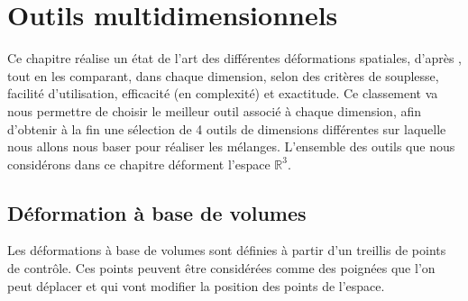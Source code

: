 
\chapter{Outils multidimensionnels}

\graphicspath{{Chapter1/Chapter1Figs/PNG/}{Chapter1/Chapter1Figs/PDF/}{Chapter1/Chapter1Figs/}}

Ce chapitre réalise un état de l'art des différentes déformations
spatiales, d'après \cite{GB08}, tout en les comparant, dans chaque
dimension, selon des critères de souplesse, facilité d'utilisation,
efficacité (en complexité) et exactitude. Ce classement va nous
permettre de choisir le meilleur outil associé à chaque dimension,
afin d'obtenir à la fin une sélection de 4 outils de dimensions
différentes sur laquelle nous allons nous baser pour réaliser les
mélanges. L'ensemble des outils que nous considérons dans ce chapitre
déforment l'espace $\mathbb{R}^3$.

\section{Déformation à base de volumes}
Les déformations à base de volumes sont définies à partir d'un
treillis de points de contrôle. Ces points peuvent être considérées
comme des poignées que l'on peut déplacer et qui vont modifier la
position des points de l'espace.

